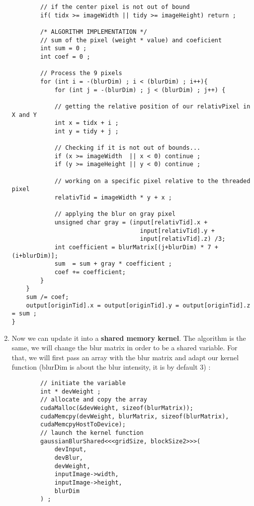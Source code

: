 \documentclass{article}
\begin{document}
\begin{enumerate}
\begin{verbatim}
	    // if the center pixel is not out of bound 
	    if( tidx >= imageWidth || tidy >= imageHeight) return ;
	
	    /* ALGORITHM IMPLEMENTATION */
	    // sum of the pixel (weight * value) and coeficient 
	    int sum = 0 ;
	    int coef = 0 ;
	
        // Process the 9 pixels 
        for (int i = -(blurDim) ; i < (blurDim) ; i++){
            for (int j = -(blurDim) ; j < (blurDim) ; j++) {
			
            // getting the relative position of our relativPixel in X and Y
            int x = tidx + i ;
            int y = tidy + j ;
			
            // Checking if it is not out of bounds...
            if (x >= imageWidth  || x < 0) continue ;
            if (y >= imageHeight || y < 0) continue ;

            // working on a specific pixel relative to the threaded pixel
            relativTid = imageWidth * y + x ;
			
            // applying the blur on gray pixel 
            unsigned char gray = (input[relativTid].x + 
			                        input[relativTid].y + 
			                        input[relativTid].z) /3;
            int coefficient = blurMatrix[(j+blurDim) * 7 + (i+blurDim)];
            sum  = sum + gray * coefficient ;
            coef += coefficient;
        }
    }
    sum /= coef;
    output[originTid].x = output[originTid].y = output[originTid].z = sum ;
}
    \end{verbatim}
    
    \item 
    Now we can update it into a \textbf{shared memory kernel}. The algorithm is the same, we will change the blur matrix in order to be a shared variable. For that, we will first pass an array with the blur matrix and adapt our kernel function (blurDim is about the blur intensity, it is by default 3) : 
    \begin{verbatim}
        // initiate the variable
        int * devWeight ;
        // allocate and copy the array 
        cudaMalloc(&devWeight, sizeof(blurMatrix)); 
        cudaMemcpy(devWeight, blurMatrix, sizeof(blurMatrix), 
        cudaMemcpyHostToDevice);
        // launch the kernel function
        gaussianBlurShared<<<gridSize, blockSize2>>>(
            devInput, 
            devBlur, 
            devWeight, 
            inputImage->width, 
            inputImage->height, 
            blurDim
        ) ; 
    \end{verbatim}
    

\end{enumerate}
\end{document}
